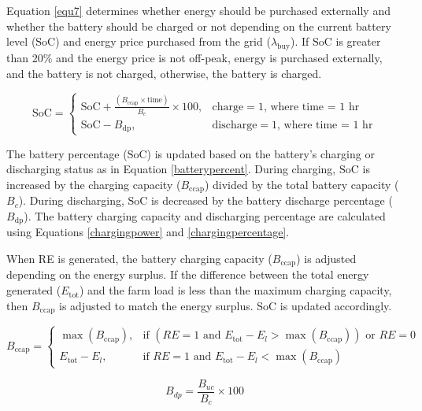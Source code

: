 \documentclass[preprint,12pt]{elsarticle}
\begin{document}
Equation \ref{equ7} determines whether energy should be purchased externally and whether the battery should be charged or not depending on the current battery level ($\text{SoC}$) and energy price purchased from the grid ($\lambda_{\text{buy}}$). If $\text{SoC}$ is greater than 20\% and the energy price is not off-peak, energy is purchased externally, and the battery is not charged, otherwise, the battery is charged.

\begin{equation}
\label{batterypercent}
\text{SoC} =
\begin{cases}
\text{SoC} + \frac{(B_{\text{ccap}} \times \text{time})}{B_{c}} \times 100, & \text{charge}=1\text{, where time = 1 hr} \\
\text{SoC} - B_{\text{dp}}, & \text{discharge}=1\text{, where time = 1 hr}
\end{cases}
\end{equation}

The battery percentage ($\text{SoC}$) is updated based on the battery's charging or discharging status as in Equation \ref{batterypercent}. During charging, $\text{SoC}$ is increased by the charging capacity ($B_{\text{ccap}}$) divided by the total battery capacity ($B_{c}$). During discharging, $\text{SoC}$ is decreased by the battery discharge percentage ($B_{\text{dp}}$). The battery charging capacity and discharging percentage are calculated using Equations \ref{chargingpower} and \ref{chargingpercentage}.

When RE is generated, the battery charging capacity ($B_{\text{ccap}}$) is adjusted depending on the energy surplus. If the difference between the total energy generated ($E_{\text{tot}}$) and the farm load is less than the maximum charging capacity, then $B_{\text{ccap}}$ is adjusted to match the energy surplus. $\text{SoC}$ is updated accordingly.

\begin{equation}
\label{chargingpower}
B_{\text{ccap}} = 
\begin{cases}
\max(B_{\text{ccap}}), & \text{if } (RE = 1 \text{ and } E_{\text{tot}} - E_{l} > \max(B_{\text{ccap}})) \text{ or } RE = 0 \\
E_{\text{tot}} - E_{l}, & \text{if } RE = 1 \text{ and } E_{\text{tot}} - E_{l} < \max(B_{\text{ccap}})
\end{cases}
\end{equation}

\begin{equation}
\label{chargingpercentage}
B_{dp} = \frac{B_{uc}}{B_c}\times 100
\end{equation}
\end{document}

